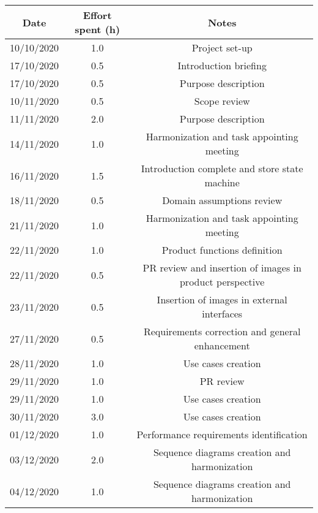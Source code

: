 \documentclass[../../main.tex]{subfiles}
\begin{document}
    \begin{center}
        \begin{tabular}{|c| |c| |c|} 
            \hline
            Date & Effort spent (h) & Notes\\ [0.5ex] 
            \hline\hline
            10/10/2020 & 1.0 & Project set-up\\ 
            17/10/2020 & 0.5 & Introduction briefing\\ 
            17/10/2020 & 0.5 & Purpose description\\ 
            10/11/2020 & 0.5 & Scope review\\
            11/11/2020 & 2.0 & Purpose description\\
            14/11/2020 & 1.0 & Harmonization and task appointing meeting\\
            16/11/2020 & 1.5 & Introduction complete and store state machine\\
            18/11/2020 & 0.5 & Domain assumptions review\\
            21/11/2020 & 1.0 & Harmonization and task appointing meeting\\
            22/11/2020 & 1.0 & Product functions definition\\
            22/11/2020 & 0.5 & PR review and insertion of images in product perspective\\
            23/11/2020 & 0.5 & Insertion of images in external interfaces\\
            27/11/2020 & 0.5 & Requirements correction and general enhancement\\
            28/11/2020 & 1.0 & Use cases creation\\
            29/11/2020 & 1.0 & PR review\\
            29/11/2020 & 1.0 & Use cases creation\\
            30/11/2020 & 3.0 & Use cases creation\\
            01/12/2020 & 1.0 & Performance requirements identification\\
            03/12/2020 & 2.0 & Sequence diagrams creation and harmonization\\
            04/12/2020 & 1.0 & Sequence diagrams creation and harmonization\\
            \hline
        \end{tabular}
    \end{center}
\end{document}
